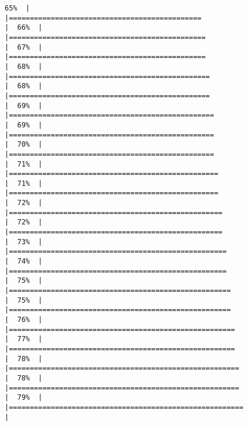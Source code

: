\documentclass[
]{article}
\begin{document}
\begin{verbatim}
65%  |                                                                              |==============================================                        |  66%  |                                                                              |===============================================                       |  67%  |                                                                              |===============================================                       |  68%  |                                                                              |================================================                      |  68%  |                                                                              |================================================                      |  69%  |                                                                              |=================================================                     |  69%  |                                                                              |=================================================                     |  70%  |                                                                              |=================================================                     |  71%  |                                                                              |==================================================                    |  71%  |                                                                              |==================================================                    |  72%  |                                                                              |===================================================                   |  72%  |                                                                              |===================================================                   |  73%  |                                                                              |====================================================                  |  74%  |                                                                              |====================================================                  |  75%  |                                                                              |=====================================================                 |  75%  |                                                                              |=====================================================                 |  76%  |                                                                              |======================================================                |  77%  |                                                                              |======================================================                |  78%  |                                                                              |=======================================================               |  78%  |                                                                              |=======================================================               |  79%  |                                                                              |========================================================              |  
\end{verbatim}
\end{document}
